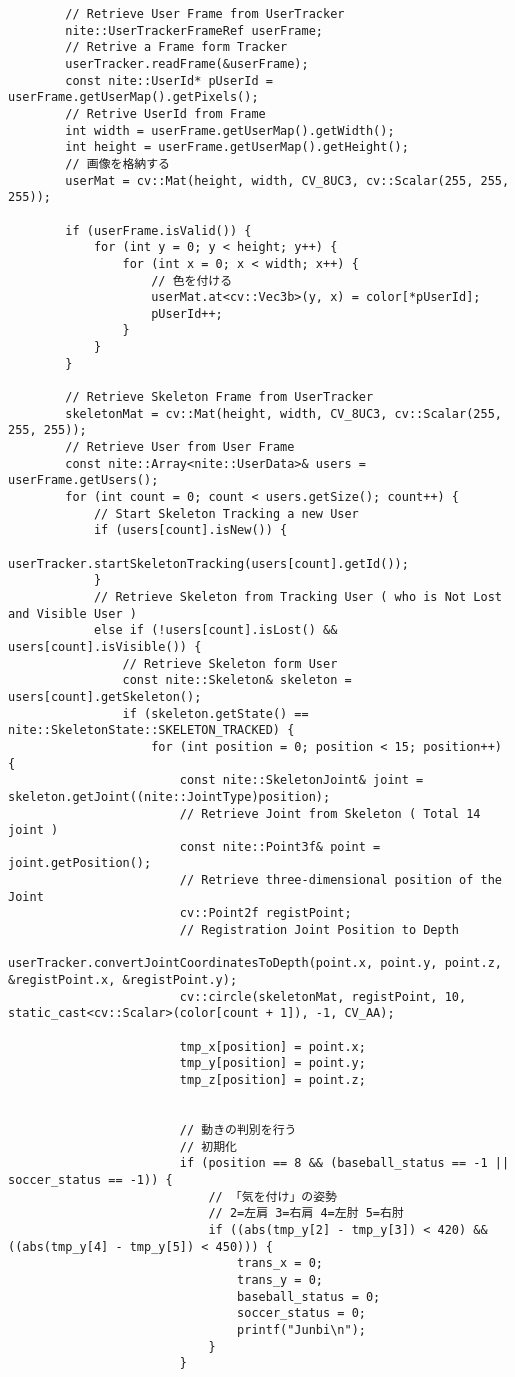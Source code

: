 \begin{lstlisting}
		// Retrieve User Frame from UserTracker
		nite::UserTrackerFrameRef userFrame;
		// Retrive a Frame form Tracker
		userTracker.readFrame(&userFrame); 
		const nite::UserId* pUserId = userFrame.getUserMap().getPixels();
		// Retrive UserId from Frame
		int width = userFrame.getUserMap().getWidth();
		int height = userFrame.getUserMap().getHeight();
		// 画像を格納する
		userMat = cv::Mat(height, width, CV_8UC3, cv::Scalar(255, 255, 255));

		if (userFrame.isValid()) {
			for (int y = 0; y < height; y++) {
				for (int x = 0; x < width; x++) {
					// 色を付ける
					userMat.at<cv::Vec3b>(y, x) = color[*pUserId]; 
					pUserId++;
				}
			}
		}

		// Retrieve Skeleton Frame from UserTracker
		skeletonMat = cv::Mat(height, width, CV_8UC3, cv::Scalar(255, 255, 255));
		// Retrieve User from User Frame
		const nite::Array<nite::UserData>& users = userFrame.getUsers(); 
		for (int count = 0; count < users.getSize(); count++) {
			// Start Skeleton Tracking a new User
			if (users[count].isNew()) {
				userTracker.startSkeletonTracking(users[count].getId());
			}
			// Retrieve Skeleton from Tracking User ( who is Not Lost and Visible User )
			else if (!users[count].isLost() && users[count].isVisible()) {
				// Retrieve Skeleton form User
				const nite::Skeleton& skeleton = users[count].getSkeleton(); 
				if (skeleton.getState() == nite::SkeletonState::SKELETON_TRACKED) {
					for (int position = 0; position < 15; position++) {
						const nite::SkeletonJoint& joint = skeleton.getJoint((nite::JointType)position);
						// Retrieve Joint from Skeleton ( Total 14 joint )
						const nite::Point3f& point = joint.getPosition();
						// Retrieve three-dimensional position of the Joint
						cv::Point2f registPoint;
						// Registration Joint Position to Depth
						userTracker.convertJointCoordinatesToDepth(point.x, point.y, point.z, &registPoint.x, &registPoint.y);
						cv::circle(skeletonMat, registPoint, 10, static_cast<cv::Scalar>(color[count + 1]), -1, CV_AA);

						tmp_x[position] = point.x;
						tmp_y[position] = point.y;
						tmp_z[position] = point.z;


						// 動きの判別を行う
						// 初期化
						if (position == 8 && (baseball_status == -1 || soccer_status == -1)) {
							// 「気を付け」の姿勢
							// 2=左肩 3=右肩 4=左肘 5=右肘
							if ((abs(tmp_y[2] - tmp_y[3]) < 420) && ((abs(tmp_y[4] - tmp_y[5]) < 450))) {
								trans_x = 0;
								trans_y = 0;
								baseball_status = 0;
								soccer_status = 0;
								printf("Junbi\n");
							}
						}


\end{lstlisting}
